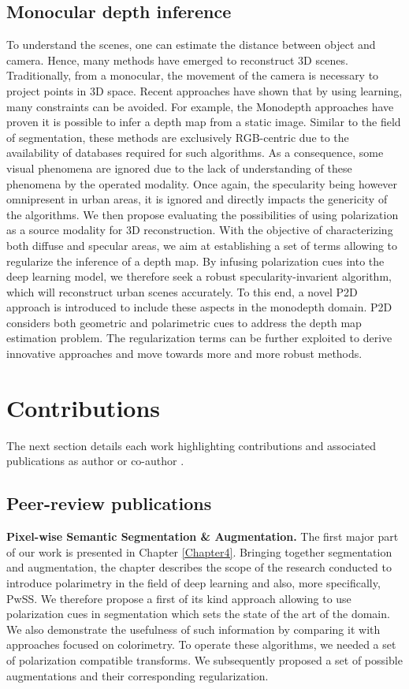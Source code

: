 \subsection{Monocular depth inference}
To understand the scenes, one can estimate the distance between object and camera. Hence, many methods have emerged to reconstruct 3D scenes. Traditionally, from a monocular, the movement of the camera is necessary to project points in 3D space. Recent approaches have shown that by using learning, many constraints can be avoided. For example, the Monodepth approaches have proven it is possible to infer a depth map from a static image.
Similar to the field of segmentation, these methods are exclusively RGB-centric due to the availability of databases required for such algorithms. As a consequence, some visual phenomena are ignored due to the lack of understanding of these phenomena by the operated modality. Once again, the specularity being however omnipresent in urban areas, it is ignored and directly impacts the genericity of the algorithms.
We then propose evaluating the possibilities of using polarization as a source modality for 3D reconstruction. With the objective of characterizing both diffuse and specular areas, we aim at establishing a set of terms allowing to regularize the inference of a depth map. By infusing polarization cues into the deep learning model, we therefore seek a robust specularity-invarient algorithm, which will reconstruct urban scenes accurately.
To this end, a novel P2D approach is introduced to include these aspects in the monodepth domain. P2D considers both geometric and polarimetric cues to address the depth map estimation problem. The regularization terms can be further exploited to derive innovative approaches and move towards more and more robust methods.

\section{Contributions}
The next section details each work highlighting contributions and associated publications as author \cite{blanchon2019outdoor,blanchon2019utilisation,blanchon2021p2d,blanchon2021polarimetric,blanchon2020intro} or co-author \cite{zhang2019exploration,zhang2019explorationn}.

\subsection{Peer-review publications}
\textbf{Pixel-wise Semantic Segmentation \& Augmentation. }The first major part of our work is presented in Chapter \ref{Chapter4}. Bringing together segmentation and augmentation, the chapter describes the scope of the research conducted to introduce polarimetry in the field of deep learning and also, more specifically, PwSS.
We therefore propose a first of its kind approach allowing to use polarization cues in segmentation which sets the state of the art of the domain. We also demonstrate the usefulness of such information by comparing it with approaches focused on colorimetry. To operate these algorithms, we needed a set of polarization compatible transforms. We subsequently proposed a set of possible augmentations and their corresponding regularization.

